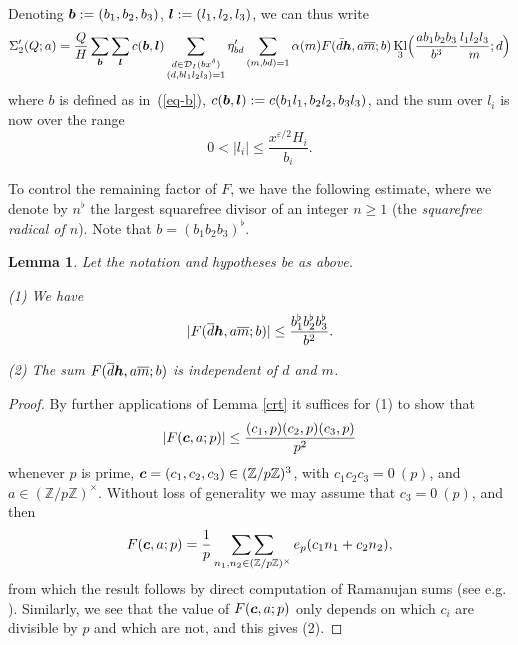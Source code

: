 \documentclass[12pt,a4paper,reqno]{amsart}
\numberwithin{equation}{section}
\DeclareMathOperator{\hypk}{Kl}
\theoremstyle{plain}
\newtheorem{lemma}[theorem]{Lemma}
\theoremstyle{definition}
\newcommand\Z{\mathbb{Z}}
\newcommand\eps{\varepsilon}
\newcommand{\DIone}[2]{\mathcal{D}_{{#1}}({#2})}
\newcommand{\uple}[1]{\text{\boldmath${#1}$}}
\newcommand\sumsum{\mathop{\sum\sum}\limits}
\begin{document}
Denoting $\uple{b}:=(b_1,b_2,b_3)$, $\uple{l}:=(l_1,l_2,l_3)$, we can
thus write
$$
\Sigma'_2(Q;a)=\frac{Q}{H}\sum_{\uple{b}}\sum_{\uple{l}}
c(\uple{b},\uple{l}) \sum_{\substack{d\in
    \DIone{I}{bx^{\delta}}\\(d,bl_1l_2l_3)=1}}\eta'_{bd}
\sum_{(m,bd)=1} \alpha(m) F(\bar{d}\uple{h},a\overline{m};b)
\hypk_3\Bigl(\frac{ab_1b_2b_3}{b^3} \frac{l_1l_2l_3}{m};d\Bigr)
$$
where $b$ is defined as in~(\ref{eq-b}), 
$c(\uple{b},\uple{l}):=c(b_1l_1,b_2l_2,b_3l_3)$, and the sum over $l_i$
is now over the range
\begin{equation}\label{eq-l-range}
  0 < |l_i| \leq \frac{x^{\eps/2} H_i}{b_i}.
\end{equation}

To control the remaining factor of $F$, we have the following
estimate, where we denote by $n^{\flat}$ the largest squarefree
divisor of an integer $n\geq 1$ (the \emph{squarefree radical of
  $n$}). Note that $b=(b_1b_2b_3)^{\flat}$.

\begin{lemma}  Let the notation and hypotheses be as above.

\emph{(1)} We have
$$ 
|F( \overline{d}\uple{h}, a \overline{m}; b)| \leq \frac{b_1^{\flat}
  b_2^{\flat}b_3^{\flat}}{b^2}.
$$
\par
\emph{(2)} The sum $F( \overline{d}\uple{h},a\overline{m};b)$ is
independent of $d$ and $m$.
\end{lemma}

\begin{proof}
  By further applications of Lemma \ref{crt} it suffices for (1) to
  show that
$$ 
|F( \uple{c}, a; p)| \leq \frac{(c_1,p) (c_2,p) (c_3,p)}{p^2}
$$
whenever $p$ is prime, $\uple{c}=(c_1,c_2,c_3) \in (\Z/p\Z)^3$, with
$c_1c_2c_3 = 0\ (p)$, and $a \in (\Z/p\Z)^\times$. Without loss of
generality we may assume that $c_3 = 0\ (p)$, and then 
$$ 
F(\uple{c},a;p)=\frac{1}{p} \sumsum_{n_1,n_2 \in (\Z/p\Z)^\times} e_p(c_1
n_1 + c_2 n_2 ),
$$ 
from which the result follows by direct computation of Ramanujan
sums (see e.g. \cite[(3.5)]{ik}). Similarly, we see that the value of $F(\uple{c},a;p)$ only depends
on which $c_i$ are divisible by $p$ and which are not, and this gives
(2). 
\end{proof}
\end{document}
